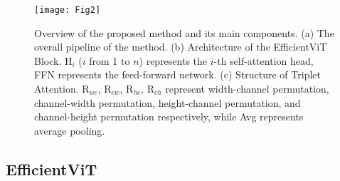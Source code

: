 \documentclass[a4paper,fleqn]{cas-sc}
\begin{document}
\begin{figure}[!htbp]
	\centering	
	\texttt{[image: Fig2]}
	\caption{Overview of the proposed method and its main components. (a) The overall pipeline of the method. (b) Architecture of the EfficientViT Block. H$_i$ ($i$ from 1 to $n$) represents the $i$-th self-attention head, FFN represents the feed-forward network. (c) Structure of Triplet Attention. R$_{wc}$, R$_{cw}$, R$_{hc}$, R$_{ch}$ represent width-channel permutation, channel-width permutation, height-channel permutation, and channel-height permutation respectively, while Avg represents average pooling.}
	\label{fig:method_overview}
\end{figure}

\subsection{EfficientViT}
\end{document}
